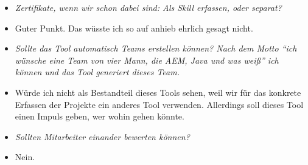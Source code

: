 \begin{itemize}
\item[] \textit{Zertifikate, wenn wir schon dabei sind: Als Skill erfassen, oder separat?}
\item[] Guter Punkt. Das wüsste ich so auf anhieb ehrlich gesagt nicht.

\item[] \textit{Sollte das Tool automatisch Teams erstellen können? Nach dem Motto “ich wünsche eine Team von vier Mann, die AEM, Java und was weiß” ich können und das Tool generiert dieses Team.}
\item[] Würde ich nicht als Bestandteil dieses Tools sehen, weil wir für das konkrete Erfassen der Projekte ein anderes Tool verwenden. Allerdings soll dieses Tool einen Impuls geben, wer wohin gehen könnte.
\item[] \textit{Sollten Mitarbeiter einander bewerten können?}
\item[] Nein.
\end{itemize}



